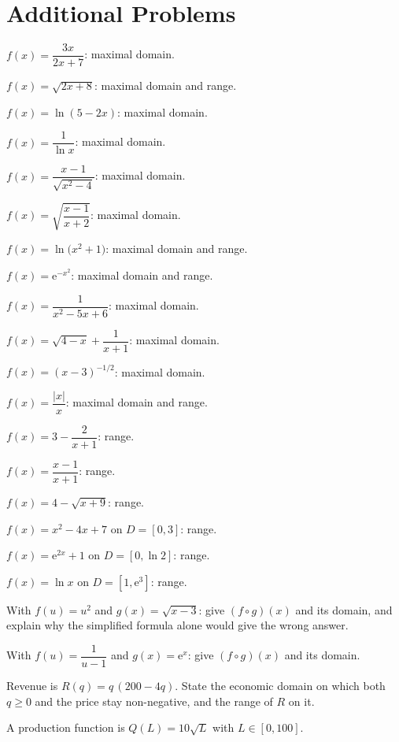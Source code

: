 \section{Additional Problems}

\begin{problems}
  \item $f(x)=\dfrac{3x}{2x+7}$: maximal domain.
  \item $f(x)=\sqrt{2x+8}$: maximal domain and range.
  \item $f(x)=\ln(5-2x)$: maximal domain.
  \item $f(x)=\dfrac{1}{\ln x}$: maximal domain.
  \item $f(x)=\dfrac{x-1}{\sqrt{x^{2}-4}}$: maximal domain.
  \item $f(x)=\sqrt{\dfrac{x-1}{x+2}}$: maximal domain.
  \item $f(x)=\ln\!\bigl(x^{2}+1\bigr)$: maximal domain and range.
  \item $f(x)=\mathrm{e}^{-x^{2}}$: maximal domain and range.
  \item $f(x)=\dfrac{1}{x^{2}-5x+6}$: maximal domain.
  \item $f(x)=\sqrt{4-x}+\dfrac{1}{x+1}$: maximal domain.
  \item $f(x)=(x-3)^{-1/2}$: maximal domain.
  \item $f(x)=\dfrac{|x|}{x}$: maximal domain and range.
  \item $f(x)=3-\dfrac{2}{x+1}$: range.
  \item $f(x)=\dfrac{x-1}{x+1}$: range.
  \item $f(x)=4-\sqrt{x+9}$: range.
  \item $f(x)=x^{2}-4x+7$ on $D=[0,3]$: range.
  \item $f(x)=\mathrm{e}^{2x}+1$ on $D=[0,\ln 2]$: range.
  \item $f(x)=\ln x$ on $D=[1,\mathrm{e}^{3}]$: range.
  \item With $f(u)=u^{2}$ and $g(x)=\sqrt{x-3}$: give $(f\circ g)(x)$ and
        its domain, and explain why the simplified formula alone would give
        the wrong answer.
  \item With $f(u)=\dfrac{1}{u-1}$ and $g(x)=\mathrm{e}^{x}$: give
        $(f\circ g)(x)$ and its domain.
  \item Revenue is $R(q)=q\,(200-4q)$. State the economic domain on which
        both $q\ge 0$ and the price stay non-negative, and the range of $R$
        on it.
  \item A production function is $Q(L)=10\sqrt{L}$ with $L\in[0,100]$.

\end{problems}
